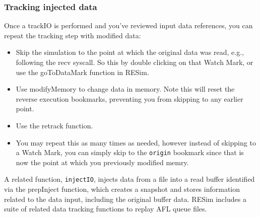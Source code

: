 \documentclass[titlepage]{article}
\begin{document}
\subsubsection{Tracking injected data}
Once a trackIO is performed and you've reviewed input data references, you can repeat the tracking step with modified data:
\begin{itemize}
\item Skip the simulation to the point at which the original data was read, e.g., following the recv syscall.  So this by double clicking
on that Watch Mark, or use the goToDataMark function in RESim.
\item Use modifyMemory to change data in memory.  Note this will reset the reverse execution bookmarks, preventing you from skipping to
any earlier point.
\item Use the retrack function.
\item You may repeat this as many times as needed, however instead of skipping to a Watch Mark, you can simply skip to the {\tt origin}
bookmark since that is now the point at which you previously modified memry.
\end{itemize}

A related function,  {\tt injectIO}, injects data from a file into a read buffer identified via the prepInject function, which creates a snapshot
and stores information related to the data input, including the original buffer data.
RESim includes a suite of related data tracking functions to replay AFL queue files.
\end{document}
